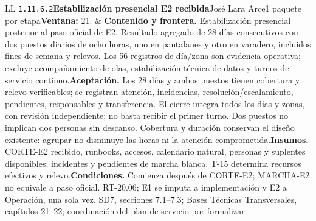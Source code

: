 \begin{longtable}{L{\tabcolsep\relax}L{\tabcolsep\relax}}
\texttt{1.\allowbreak{}11.\allowbreak{}6.\allowbreak{}2}\newline{}\textbf{Estabilización presencial E2 recibida}\newline{}José Lara Arce\newline{}1 paquete por etapa\newline{}\textbf{Ventana:} 21. & \textbf{Contenido y frontera.} Estabilización presencial posterior al paso oficial de E2. Resultado agregado de 28 días consecutivos con dos puestos diarios de ocho horas, uno en pantalanes y otro en varadero, incluidos fines de semana y relevos. Los 56 registros de día/zona son evidencia operativa; excluye acompañamiento de olas, estabilización técnica de datos y turnos de servicio continuo.\newline{}\textbf{Aceptación.} Los 28 días y ambos puestos tienen cobertura y relevo verificables; se registran atención, incidencias, resolución/escalamiento, pendientes, responsables y transferencia. El cierre integra todos los días y zonas, con revisión independiente; no basta recibir el primer turno. Dos puestos no implican dos personas sin descanso. Cobertura y duración conservan el diseño existente: agrupar no disminuye las horas ni la atención comprometida.\newline{}\textbf{Insumos.} CORTE-E2 recibido, runbooks, accesos, calendario natural, personas y suplentes disponibles; incidentes y pendientes de marcha blanca. T-15 determina recursos efectivos y relevo.\newline{}\textbf{Condiciones.} Comienza después de CORTE-E2; MARCHA-E2 no equivale a paso oficial. RT-20.06; E1 se imputa a implementación y E2 a Operación, una sola vez. SD7, secciones 7.1--7.3; Bases Técnicas Transversales, capítulos 21--22; coordinación del plan de servicio por formalizar.\\\hline

\end{longtable}
